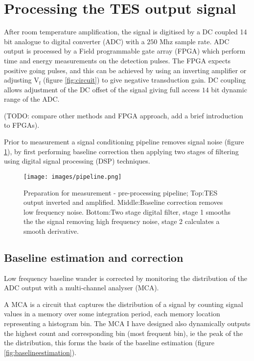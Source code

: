 \documentclass{article}
\begin{document}
\section{Processing the TES output signal}
After room temperature amplification, the signal is 
digitised by a DC coupled 14 bit analogue to digital converter (ADC) with a
$250$ Mhz sample rate. ADC output is processed by a Field programmable gate array (FPGA) which perform time and
energy measurements on the detection pulses. The FPGA expects positive going pulses,
and this can be  achieved by using an inverting amplifier or adjusting 
$\mathrm{V}_\mathrm{f}$ (figure \ref{fig:circuit}) to give negative
transduction gain. DC coupling allows adjustment of the DC offset of the signal
giving full access $14$ bit dynamic range of the ADC.

(TODO: compare other methods and FPGA approach, add a brief introduction to
FPGAs).

Prior to measurement a signal conditioning pipeline removes signal noise
(figure \ref{fig:pipeline}), by first performing baseline correction then
applying two stages of filtering using digital signal processing (DSP) 
techniques.

\begin{figure}[!hpbt]
  \centering
  \texttt{[image: images/pipeline.png]}
  \caption{
    Preparation for measurement - pre-processing pipeline; Top:TES output
    inverted and amplified.
    Middle:Baseline correction removes low frequency noise. 
    Bottom:Two stage digital filter,
    stage 1 smooths the the signal removing high frequency noise, stage 2
    calculates a smooth derivative.
  }
  \label{fig:pipeline} 
\end{figure}

\subsection{Baseline estimation and correction}
Low frequency baseline wander is corrected by monitoring the distribution of the
ADC output with a multi-channel analyser (MCA). 


A MCA is a circuit that captures the distribution of a signal by
counting signal values in a memory over some integration period, each
memory location representing a histogram bin. 
The MCA I have designed
also dynamically outputs the highest count and corresponding bin (most frequent
bin), ie the peak of the the distribution, this forms the basis of the baseline
estimation (figure \ref{fig:baselineestimation}). 
\end{document}

